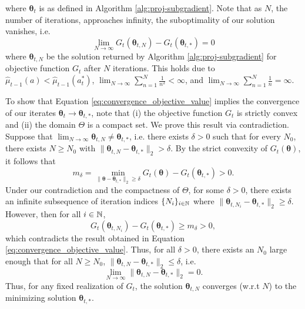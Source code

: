 \documentclass{article}
\begin{document}
\begin{appendices}
\begin{equation}
\end{equation}
where $\bm{\theta}_t$ is as defined in Algorithm \ref{alg:proj-subgradient}. Note that as $N$, the number of iterations, approaches infinity, the suboptimality of our solution vanishes, i.e.
\begin{equation}\label{eq:convergence_objective_value}
    \lim_{N \rightarrow \infty} G_t(\bm{\theta}_{t, N}) - G_t(\bm{\theta}_{t,*}) =0
\end{equation}
where $\bm{\theta}_{t,N}$ be the solution returned by Algorithm \ref{alg:proj-subgradient} for objective function $G_t$ after $N$ iterations. This holds due to $\hat\mu_{t-1}(a) < \hat\mu_{t-1}(a_t^*)$, $\lim_{N \rightarrow \infty} \sum_{n=1}^N\frac{1}{n^2} < \infty$, and $\lim_{N \rightarrow \infty}\sum_{n=1}^N \frac{1}{n} = \infty$. 


To show that Equation \ref{eq:convergence_objective_value} implies the convergence of our iterates $\bm{\theta}_t \rightarrow \bm{\theta}_{t,*}$, note that (i) the objective function $G_t$ is strictly convex and (ii) the domain $\Theta$ is a compact set. We prove this result via contradiction. Suppose that $\lim_{N \rightarrow \infty}\bm{\theta}_{t,N} \neq \bm{\theta}_{t,*}$, i.e. there exists $\delta >0$ such that for every $N_0$, there exists $N \geq N_0$ with $\|\bm{\theta}_{t,N} - \bm{\theta}_{t, *}\|_2 > \delta$. By the strict convexity of $G_t(\bm{\theta})$, it follows that 
\begin{equation}
    m_\delta = \min_{\|\bm{\theta} - \bm{\theta}_{t,*} \|_2 \geq \delta} G_{t}(\bm\theta) - G_t(\bm{\theta}_{t,*}) > 0.
\end{equation}
Under our contradiction and the compactness of $\Theta$, for some $\delta>0$, there exists an infinite subsequence of iteration indices $\{N_i\}_{i \in \mathbb{N}}$ where $\|\bm\theta_{t, N_i} - \bm\theta_{t, *} \|_2 \geq \delta$. However, then for all $i \in \mathbb{N}$, 
\begin{equation}
 G_t(\bm\theta_{t, N_i} ) - G_t(\bm\theta_{t,*}) \geq m_\delta > 0,
\end{equation}
which contradicts the result obtained in Equation \eqref{eq:convergence_objective_value}. Thus, for all $\delta > 0$, there exists an $N_0$ large enough that for all $N \geq N_0$, $\|\bm\theta_{t,N} - \bm{\theta}_{t,*} \|_2 \leq \delta$, i.e.
\begin{equation}
    \lim_{N \rightarrow \infty}\|\bm{\theta}_{t,N} - \bm{\theta}_{t,*}\|_2 = 0.
\end{equation}
Thus, for any fixed realization of $G_t$, the solution $\bm{\theta}_{t, N}$ converges (w.r.t $N$) to the minimizing solution $\bm{\theta}_{t,*}$.



\end{appendices}
\end{document}
